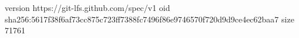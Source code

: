 version https://git-lfs.github.com/spec/v1
oid sha256:5617f38f6af73cc875c723ff7388fc7496f86e9746570f720d9d9ce4ec62baa7
size 71761
